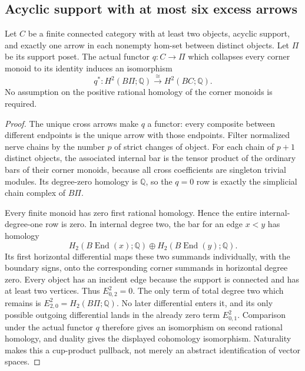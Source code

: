 \subsection{Acyclic support with at most six excess arrows}

\begin{lemma}
\label{C:singleton-support-H2}
Let $C$ be a finite connected category with at least two objects,
acyclic support, and exactly one arrow in each nonempty hom-set
between distinct objects.  Let $\Pi$ be its support poset.
The actual functor $q:C\to\Pi$ which collapses every corner
monoid to its identity induces an isomorphism
\[
 q^*:H^2(B\Pi;\mathbb Q)\xrightarrow{\ \cong\ }
      H^2(BC;\mathbb Q).
\]
No assumption on the positive rational homology of the corner
monoids is required.
\end{lemma}
\begin{proof}
The unique cross arrows make $q$ a functor: every composite
between different endpoints is the unique arrow with those
endpoints.  Filter normalized nerve chains by the number $p$
of strict changes of object.  For each chain of $p+1$ distinct
objects, the associated internal bar is the tensor product
of the ordinary bars of their corner monoids, because all
cross coefficients are singleton trivial modules.  Its
degree-zero homology is $\mathbb Q$, so the $q=0$ row is
exactly the simplicial chain complex of $B\Pi$.

Every finite monoid has zero first rational homology.  Hence
the entire internal-degree-one row is zero.  In internal
degree two, the bar for an edge $x<y$ has homology
\[
 H_2(B\operatorname{End}(x);\mathbb Q)
 \oplus H_2(B\operatorname{End}(y);\mathbb Q).
\]
Its first horizontal differential maps these two summands
individually, with the boundary signs, onto the corresponding
corner summands in horizontal degree zero.  Every object
has an incident edge because the support is connected and
has at least two vertices.  Thus $E^2_{0,2}=0$.
The only term of total degree two which remains is
$E^2_{2,0}=H_2(B\Pi;\mathbb Q)$.
No later differential enters it, and its only possible
outgoing differential lands in the already zero term
$E^2_{0,1}$.  Comparison under the actual functor $q$
therefore gives an isomorphism on second rational homology,
and duality gives the displayed cohomology isomorphism.
Naturality makes this a cup-product pullback, not merely
an abstract identification of vector spaces.
\end{proof}

